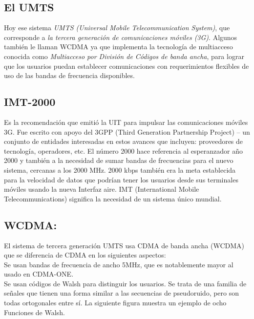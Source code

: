 \subsection{El UMTS}

Hoy ese sistema \textit{UMTS (Universal Mobile Telecommunication System)}, que corresponde a \textit{la tercera generación de comunicaciones móviles (3G)}. Algunos también le llaman WCDMA ya que implementa la tecnología de multiacceso conocida como  \textit{Multiacceso por División de Códigos de banda ancha}, para lograr que los usuarios puedan establecer comunicaciones con requerimientos flexibles de uso de las bandas de frecuencia disponibles.\\

\subsection{IMT-2000}

Es la recomendación que emitió la UIT para impulsar las comunicaciones móviles 3G. Fue escrito con apoyo del 3GPP (Third Generation Partnership Project) – un conjunto de entidades interesadas en estos avances que incluyen: proveedores de tecnología, operadores, etc. El número 2000 hace referencia al esperanzador año 2000 y también a la necesidad de sumar bandas de frecuencias para el nuevo sistema, cercanas a los 2000 MHz. 2000 kbps también era la meta establecida para la velocidad de datos que podrían tener los usuarios desde sus terminales móviles usando la nueva Interfaz aire. IMT (International Mobile Telecommunications) significa la necesidad de un sistema único mundial.\\

\subsection{WCDMA:}

El sistema de tercera generación UMTS usa CDMA de banda ancha (WCDMA) que se diferencia de CDMA en los siguientes aspectos:\\

Se usan bandas de frecuencia de ancho 5MHz, que es notablemente mayor al usado en CDMA-ONE.\\

Se usan códigos de Walsh para distinguir los usuarios. Se trata de una familia de señales que tienen una forma similar a las secuencias de pseudoruido, pero son todas ortogonales entre sí. La siguiente figura muestra un ejemplo de ocho Funciones de Walsh.\\

